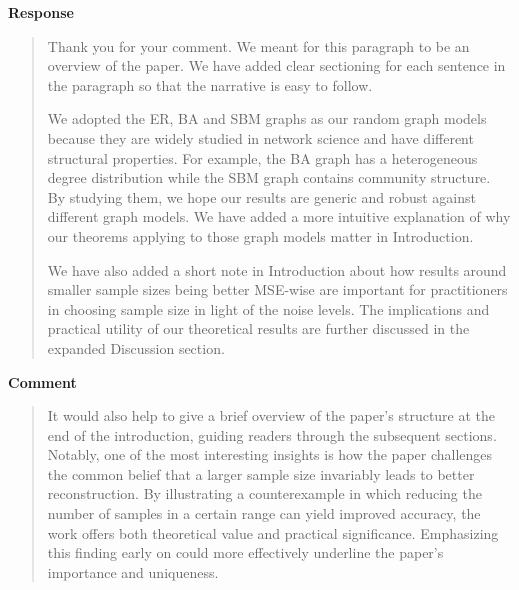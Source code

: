 \documentclass[11pt,onecolumn,journal]{IEEEtran}
\theoremstyle{definition}
\begin{document}
\textbf{Response}
\begin{quote}
Thank you for your comment. We meant for this paragraph to be an overview of the paper. We have added clear sectioning for each sentence in the paragraph so that the narrative is easy to follow.

We adopted the ER, BA and SBM graphs as our random graph models because they are widely studied in network science and have different structural properties. For example, the BA graph has a heterogeneous degree distribution while the SBM graph contains community structure. By studying them, we hope our results are generic and robust against different graph models.
We have added a more intuitive explanation of why our theorems applying to those graph models matter in Introduction. %


We have also added a short note in Introduction about how results around smaller sample sizes being better MSE-wise are important for practitioners in choosing sample size in light of the noise levels. The implications and practical utility of our theoretical results are further discussed in the expanded Discussion section.
\end{quote}

\textbf{Comment}
\begin{quote}
It would also help to give a brief overview of the paper’s structure at the end of the introduction, guiding readers through the subsequent sections. Notably, one of the most interesting insights is how the paper challenges the common belief that a larger sample size invariably leads to better reconstruction. By illustrating a counterexample in which reducing the number of samples in a certain range can yield improved accuracy, the work offers both theoretical value and practical significance. Emphasizing this finding early on could more effectively underline the paper’s importance and uniqueness.
\end{quote}
\end{document}
